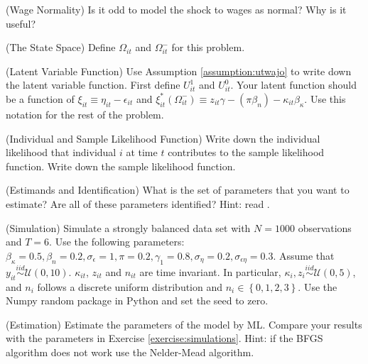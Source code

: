 \begin{exercise} (Wage Normality)
Is it odd to model the shock to wages as normal? Why is it useful? 
\end{exercise}

\begin{exercise} (The State Space)
Define $\Omega_{it}$ and $\Omega_{it}^-$ for this problem. 
\end{exercise}

\begin{exercise} (Latent Variable Function)
Use Assumption \ref{assumption:utwajo} to write down the latent variable function. First define $U_{it}^1$ and $U_{it}^0$. Your latent function should be a function of $\xi_{it} \equiv \eta_{it} - \epsilon_{it}$ and  $\xi_{it}^*\left( \Omega_{it}^- \right) \equiv z_{it} \gamma - \left( \pi \beta_{n} \right) - \kappa_{it} \beta_{\kappa}$. Use this notation for the rest of the problem.
\end{exercise}

\begin{exercise} (Individual and Sample Likelihood Function)
Write down the individual likelihood that individual $i$ at time $t$ contributes to the sample likelihood function. Write down the sample likelihood function.
\end{exercise}

\begin{exercise} (Estimands and Identification) \label{exercise:estimands}
What is the set of parameters that you want to estimate? Are all of these parameters identified? Hint: read \citet{heckman1979sample}.
\end{exercise}

\begin{exercise} (Simulation) \label{exercise:simulations}
Simulate a strongly balanced data set with $N = 1000$ observations and $T=6$. Use the following parameters: $\beta_\kappa = 0.5, \beta_n = 0.2, \sigma_\epsilon = 1, \pi = 0.2, \gamma_1 = 0.8, \sigma_\eta = 0.2, \sigma_{\epsilon \eta} = 0.3$. Assume that $y_{it} \overset{iid}{\sim} \mathcal{U} (0,10)$. $\kappa_{it}$, $z_{it}$ and $n_{it}$ are time invariant. In particular, $\kappa_{i}, z_{i} \overset{iid}{\sim} \mathcal{U} (0,5)$, and $n_{i}$ follows a discrete uniform distribution and $n_{i} \in \left\{0,1,2,3\right\}$. Use the Numpy random package in Python and set the seed to zero.
\end{exercise}

\begin{exercise} (Estimation)
Estimate the parameters of the model by ML. Compare your results with the parameters in Exercise \ref{exercise:simulations}. Hint: if the BFGS algorithm does not work use the Nelder-Mead algorithm.
\end{exercise}

